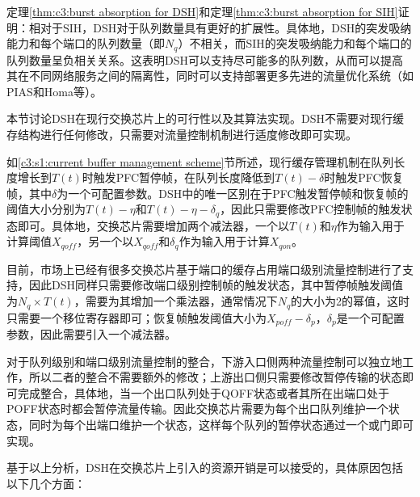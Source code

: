 
定理\ref{thm:c3:burst absorption for DSH}和定理\ref{thm:c3:burst absorption for SIH}证明：相对于SIH，DSH对于队列数量具有更好的扩展性。具体地，DSH的突发吸纳能力和每个端口的队列数量（即$N_q$）不相关，而SIH的突发吸纳能力和每个端口的队列数量呈负相关关系。这表明DSH可以支持尽可能多的队列数，从而可以提高其在不同网络服务之间的隔离性，同时可以支持部署更多先进的流量优化系统（如PIAS\cite{NSDI15PIAS}和Homa\cite{SIGCOMM18Homa}等）。


\label{c3:s5:dsh implementation}

本节讨论DSH在现行交换芯片上的可行性以及其算法实现。DSH不需要对现行缓存结构进行任何修改，只需要对流量控制机制进行适度修改即可实现。


如\ref{c3:s1:current buffer management scheme}节所述，现行缓存管理机制在队列长度增长到$T(t)$时触发PFC暂停帧，在队列长度降低到$T(t)-\delta$时触发PFC恢复帧，其中$\delta$为一个可配置参数。DSH中的唯一区别在于PFC触发暂停帧和恢复帧的阈值大小分别为$T(t)-\eta$和$T(t)-\eta-\delta_q$，因此只需要修改PFC控制帧的触发状态即可。具体地，交换芯片需要增加两个减法器，一个以$T(t)$和$\eta$作为输入用于计算阈值$X_{qoff}$，另一个以$X_{qoff}$和$δ_q$作为输入用于计算$X_{qon}$。


目前，市场上已经有很多交换芯片基于端口的缓存占用端口级别流量控制进行了支持\cite{BCM88800TM,CiscoNexus9300IB}，因此DSH同样只需要修改端口级别控制帧的触发状态，其中暂停帧触发阈值为$N_q \times T(t)$，需要为其增加一个乘法器，通常情况下$N_q$的大小为2的幂值，这时只需要一个移位寄存器即可；恢复帧触发阈值大小为$X_{poff}-\delta_p$，$\delta_p$是一个可配置参数，因此需要引入一个减法器。


对于队列级别和端口级别流量控制的整合，下游入口侧两种流量控制可以独立地工作，所以二者的整合不需要额外的修改；上游出口侧只需要修改暂停传输的状态即可完成整合，具体地，当一个出口队列处于QOFF状态或者其所在出端口处于POFF状态时都会暂停流量传输。因此交换芯片需要为每个出口队列维护一个状态，同时为每个出端口维护一个状态，这样每个队列的暂停状态通过一个或门即可实现。


基于以上分析，DSH在交换芯片上引入的资源开销是可以接受的，具体原因包括以下几个方面：

